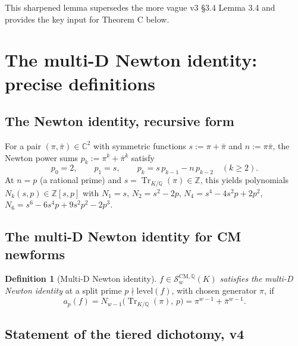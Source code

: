 \documentclass[11pt,a4paper]{amsart}
\theoremstyle{definition}
\newtheorem{definition}[theorem]{Definition}
\DeclareMathOperator{\Tr}{Tr}
\newcommand{\Q}{\mathbb{Q}}
\newcommand{\Z}{\mathbb{Z}}
\newcommand{\C}{\mathbb{C}}
\newcommand{\Scal}{\mathcal{S}}
\begin{document}
This sharpened lemma supersedes the more vague v3 \S3.4 Lemma 3.4 and provides the key input for Theorem C below.


\section{The multi-D Newton identity: precise definitions}\label{sec:newton-defn}

\subsection{The Newton identity, recursive form}\label{sec:newton-recursive}

For a pair $(\pi, \bar\pi) \in \C^2$ with symmetric functions $s := \pi + \bar\pi$ and $n := \pi \bar\pi$, the Newton power sums $p_k := \pi^k + \bar\pi^k$ satisfy
\begin{equation}\label{eq:newton-recursion}
p_0 = 2, \qquad p_1 = s, \qquad p_k = s \, p_{k-1} - n \, p_{k-2} \quad (k \ge 2).
\end{equation}
At $n = p$ (a rational prime) and $s = \Tr_{K/\Q}(\pi) \in \Z$, this yields polynomials $N_{k}(s, p) \in \Z[s, p]$ with $N_1 = s$, $N_2 = s^2 - 2p$, $N_4 = s^4 - 4 s^2 p + 2 p^2$, $N_6 = s^6 - 6 s^4 p + 9 s^2 p^2 - 2 p^3$.

\subsection{The multi-D Newton identity for CM newforms}\label{sec:multid-newton}

\begin{definition}[Multi-D Newton identity]\label{def:multiD-newton}
$f \in \Scal_w^{\mathrm{CM},\Q}(K)$ \emph{satisfies the multi-D Newton identity} at a split prime $p \nmid \mathrm{level}(f)$, with chosen generator $\pi$, if
\begin{equation}\label{eq:multid-newton}
a_p(f) = N_{w-1}\bigl(\Tr_{K/\Q}(\pi), \, p\bigr) = \pi^{w-1} + \bar\pi^{w-1}.
\end{equation}
\end{definition}

\subsection{Statement of the tiered dichotomy, v4}\label{sec:dichotomy-v4-precise}
\end{document}
